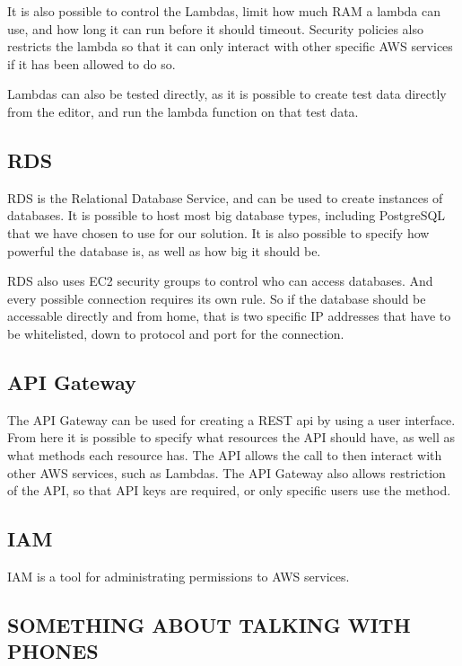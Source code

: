 It is also possible to control the Lambdas, limit how much RAM a lambda can use, and how long it can run before it should timeout. Security policies also restricts the lambda so that it can only interact with other specific AWS services if it has been allowed to do so.

Lambdas can also be tested directly, as it is possible to create test data directly from the editor, and run the lambda function on that test data.

\subsection{RDS}
RDS is the Relational Database Service, and can be used to create instances of databases. It is possible to host most big database types, including PostgreSQL that we have chosen to use for our solution. It is also possible to specify how powerful the database is, as well as how big it should be.

RDS also uses EC2 security groups to control who can access databases. And every possible connection requires its own rule. So if the database should be accessable directly and from home, that is two specific IP addresses that have to be whitelisted, down to protocol and port for the connection.

\subsection{API Gateway}
The API Gateway can be used for creating a REST api by using a user interface. From here it is possible to specify what resources the API should have, as well as what methods each resource has. The API allows the call to then interact with other AWS services, such as Lambdas.
The API Gateway also allows restriction of the API, so that API keys are required, or only specific users use the method.

\subsection{IAM}
IAM is a tool for administrating permissions to AWS services.

\subsection{SOMETHING ABOUT TALKING WITH PHONES} 


